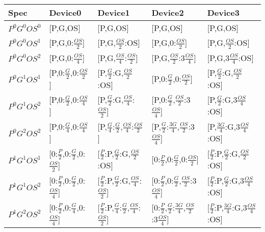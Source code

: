 \begin{table*}[]
   \centering
    \vspace{-15pt}
    \renewcommand{\arraystretch}{1.4}
\begin{tabular}{@{}lllll@{}}
\toprule

Spec    & Device0                  & Device1                   & Device2                     & Device3                   \\ \hline
$P^0G^0OS^0$ & {[}P,G,OS{]}             & {[}P,G,OS{]}              & {[}P,G,OS{]}                & {[}P,G,OS{]}              \\
$P^0G^0OS^1$ & {[}P,G,0:$\frac{OS}{2}${]}         & {[}P,G,$\frac{OS}{2}$:OS{]}         & {[}P,G,0:$\frac{OS}{2}${]}            & {[}P,G,$\frac{OS}{2}$:OS{]}         \\
$P^0G^0OS^2$ & {[}P,G,0:$\frac{OS}{4}${]}         & {[}P,G,$\frac{OS}{4}$:$\frac{OS}{2}${]}       & {[}P,G,$\frac{OS}{2}$:3$\frac{OS}{4}${]}        & {[}P,G,3$\frac{OS}{4}$:OS{]}        \\
$P^0G^1OS^1$ & {[}P,0:$\frac{G}{2}$,0:$\frac{OS}{2}${]}     & {[}P,$\frac{G}{2}$:G,$\frac{OS}{2}$:OS{]}     & {[}P,0:$\frac{G}{2}$,0:$\frac{OS}{2}${]}        & {[}P,$\frac{G}{2}$:G,$\frac{OS}{2}$:OS{]}     \\
$P^0G^1OS^2$ & {[}P,0:$\frac{G}{2}$,0:$\frac{OS}{4}${]}     & {[}P,$\frac{G}{2}$:G,$\frac{OS}{4}$:$\frac{OS}{2}${]}   & {[}P,0:$\frac{G}{2}$,$\frac{OS}{2}$:3$\frac{OS}{4}${]}    & {[}P,$\frac{G}{2}$:G,3$\frac{OS}{4}$:OS{]}    \\
$P^0G^2OS^2$ & {[}P,0:$\frac{G}{4}$,0:$\frac{OS}{4}${]}     & {[}P,$\frac{G}{4}$:$\frac{G}{2}$,$\frac{OS}{4}$:$\frac{OS}{2}${]} & {[}P,$\frac{G}{2}$:$\frac{3G}{4}$,$\frac{OS}{2}$:3$\frac{OS}{4}${]} & {[}P,$\frac{3G}{4}$:G,3$\frac{OS}{4}$:OS{]}   \\
$P^1G^1OS^1$ & {[}0:$\frac{P}{2}$,0:$\frac{G}{2}$,0:$\frac{OS}{2}${]} & {[}$\frac{P}{2}$:P,$\frac{G}{2}$:G,$\frac{OS}{2}$:OS{]} & {[}0:$\frac{P}{2}$,0:$\frac{G}{2}$,0:$\frac{OS}{2}${]}    & {[}$\frac{P}{2}$:P,$\frac{G}{2}$:G,$\frac{OS}{2}$:OS{]} \\
$P^1G^1OS^2$ & {[}0:$\frac{P}{2}$,0:$\frac{G}{2}$,0:$\frac{OS}{4}${]} & {[}$\frac{P}{2}$:P,$\frac{G}{2}$:G,$\frac{OS}{4}$:$\frac{OS}{2}${]}     & {[}0:$\frac{P}{2}$,0:$\frac{G}{2}$,$\frac{OS}{2}$:3$\frac{OS}{4}${]}       & {[}$\frac{P}{2}$:P,$\frac{G}{2}$:G,3$\frac{OS}{4}$:OS{]}   \\
$P^1G^2OS^2$ & {[}0:$\frac{P}{2}$,0:$\frac{G}{4}$,0:$\frac{OS}{4}${]} & {[}$\frac{P}{2}$:P,$\frac{G}{4}$:$\frac{G}{2}$,$\frac{OS}{4}$:$\frac{OS}{2}${]}   & {[}0:$\frac{P}{2}$,$\frac{G}{2}$:$\frac{3G}{4}$,$\frac{OS}{2}$:3$\frac{OS}{4}${]}    & {[}$\frac{P}{2}$:P,$\frac{3G}{4}$:G,3$\frac{OS}{4}$:OS{]}  \\

\end{tabular}
\end{table*}
